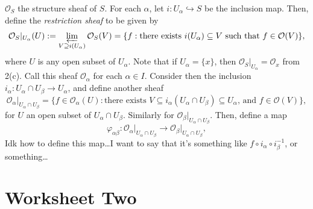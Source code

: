 \documentclass[a4paper]{report}
\theoremstyle{definition}
\theoremstyle{remark}
\theoremstyle{proposition}
\theoremstyle{conjecture}
\theoremstyle{lemma}
\theoremstyle{corollary}
\theoremstyle{exercise}
\theoremstyle{example}
\newcommand{\mcal}{\mathcal}
\begin{document}
\begin{enumerate}
        $\mcal{O}_S$ the structure sheaf of $S$. 
        For each $\alpha$, let $i: U_\alpha \hookrightarrow S$ be the inclusion
        map. Then, define the \emph{restriction sheaf} to be given by 
        $$\mcal{O}_S\vert_{U_\alpha}(U) := \varprojlim_{V \supseteq i(U_\alpha)} \mcal{O}_S(V) = \lbrace f : \text{there exists $i(U_\alpha)\subseteq V$ such that $f \in \mcal{O}(V)$}\rbrace,$$ where $U$ is any open subset of $U_\alpha$.
        Note that if $U_\alpha = \lbrace x\rbrace$, then 
        $\mcal{O}_S\vert_{U_\alpha} = \mcal{O}_x$ from 2(c). Call this sheaf
        $\mcal{O}_\alpha$ for each $\alpha \in I$. 
        Consider then the inclusion $i_{\alpha} : U_\alpha \cap U_\beta \to U_\alpha$, and 
        define another sheaf $$\mcal{O}_\alpha\vert_{U_\alpha \cap U_\beta} = \lbrace f \in\mcal{O}_\alpha(U) : \text{there exists $V \subseteq i_\alpha(U_\alpha\cap U_\beta) \subseteq U_\alpha$, and $f \in \mcal{O}(V)$}\rbrace,$$
        for $U$ an open subset of $U_\alpha \cap U_\beta$.
        Similarly for $\mcal{O}_\beta\vert_{U_\alpha \cap U_\beta}$.
        Then, define a map 
        $$\varphi_{\alpha\beta}: \mcal{O}_\alpha\vert_{U_\alpha \cap U_\beta} \longrightarrow \mcal{O}_\beta\vert_{U_\alpha \cap U_\beta},$$
        Idk how to define this map\ldots I want to say that it's something like 
        $f \circ i_\alpha \circ i_\beta^{-1}$, or something\ldots
\end{enumerate}

\section{Worksheet Two}
\end{document}
